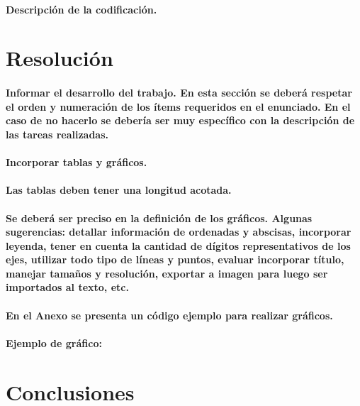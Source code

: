 \documentclass[a4paper,12pt]{article}
\begin{document}
\paragraph{\normalfont Descripción de la codificación.}

\section{Resolución}

\paragraph{\normalfont Informar el desarrollo del trabajo. En esta sección se deberá respetar el orden y numeración de los ítems requeridos en el enunciado. En el caso de no hacerlo se debería ser muy específico con la descripción de las tareas realizadas.}
\paragraph{\normalfont Incorporar tablas y gráficos. }
\paragraph{\normalfont Las tablas deben tener una longitud acotada.}
\paragraph{\normalfont Se deberá ser preciso en la definición de los gráficos. Algunas sugerencias: detallar información de ordenadas y abscisas, incorporar leyenda, tener en cuenta la cantidad de dígitos representativos de los ejes, utilizar todo tipo de líneas y puntos, evaluar incorporar título, manejar tamaños y resolución, exportar a imagen para luego ser importados al texto, etc.}
\paragraph{\normalfont En el Anexo se presenta un código ejemplo para realizar gráficos.}
\paragraph{\normalfont Ejemplo de gráfico:}

\section{Conclusiones}
\end{document}
